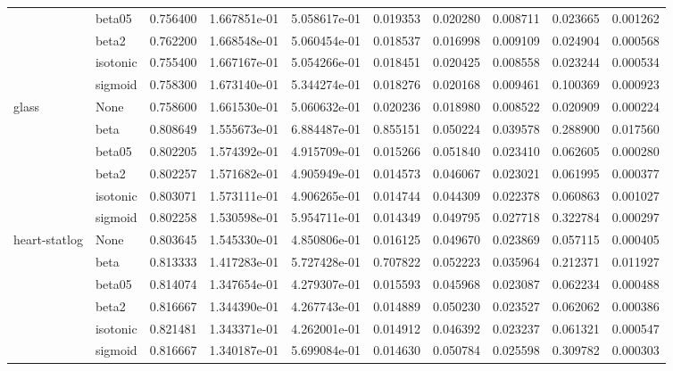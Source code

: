 \begin{tabular}{llrrrrrrrr}
        & beta05 &  0.756400 &  1.667851e-01 &  5.058617e-01 &   0.019353 &  0.020280 &  0.008711 &  0.023665 &  0.001262 \\
        & beta2 &  0.762200 &  1.668548e-01 &  5.060454e-01 &   0.018537 &  0.016998 &  0.009109 &  0.024904 &  0.000568 \\
        & isotonic &  0.755400 &  1.667167e-01 &  5.054266e-01 &   0.018451 &  0.020425 &  0.008558 &  0.023244 &  0.000534 \\
        & sigmoid &  0.758300 &  1.673140e-01 &  5.344274e-01 &   0.018276 &  0.020168 &  0.009461 &  0.100369 &  0.000923 \\
glass & None &  0.758600 &  1.661530e-01 &  5.060632e-01 &   0.020236 &  0.018980 &  0.008522 &  0.020909 &  0.000224 \\
        & beta &  0.808649 &  1.555673e-01 &  6.884487e-01 &   0.855151 &  0.050224 &  0.039578 &  0.288900 &  0.017560 \\
        & beta05 &  0.802205 &  1.574392e-01 &  4.915709e-01 &   0.015266 &  0.051840 &  0.023410 &  0.062605 &  0.000280 \\
        & beta2 &  0.802257 &  1.571682e-01 &  4.905949e-01 &   0.014573 &  0.046067 &  0.023021 &  0.061995 &  0.000377 \\
        & isotonic &  0.803071 &  1.573111e-01 &  4.906265e-01 &   0.014744 &  0.044309 &  0.022378 &  0.060863 &  0.001027 \\
        & sigmoid &  0.802258 &  1.530598e-01 &  5.954711e-01 &   0.014349 &  0.049795 &  0.027718 &  0.322784 &  0.000297 \\
heart-statlog & None &  0.803645 &  1.545330e-01 &  4.850806e-01 &   0.016125 &  0.049670 &  0.023869 &  0.057115 &  0.000405 \\
        & beta &  0.813333 &  1.417283e-01 &  5.727428e-01 &   0.707822 &  0.052223 &  0.035964 &  0.212371 &  0.011927 \\
        & beta05 &  0.814074 &  1.347654e-01 &  4.279307e-01 &   0.015593 &  0.045968 &  0.023087 &  0.062234 &  0.000488 \\
        & beta2 &  0.816667 &  1.344390e-01 &  4.267743e-01 &   0.014889 &  0.050230 &  0.023527 &  0.062062 &  0.000386 \\
        & isotonic &  0.821481 &  1.343371e-01 &  4.262001e-01 &   0.014912 &  0.046392 &  0.023237 &  0.061321 &  0.000547 \\
        & sigmoid &  0.816667 &  1.340187e-01 &  5.699084e-01 &   0.014630 &  0.050784 &  0.025598 &  0.309782 &  0.000303 \\

\end{tabular}
